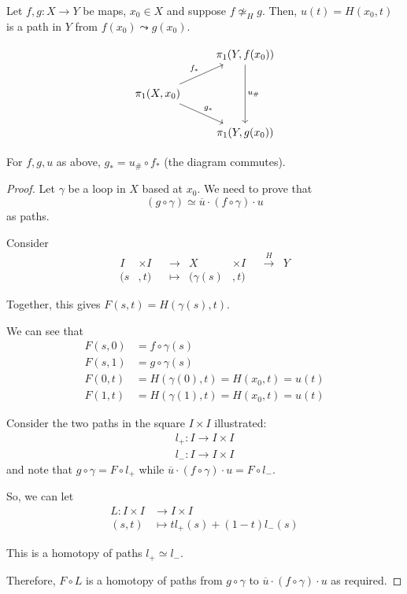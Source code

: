 \documentclass{article}
\numberwithin{nthm}{subsection}
\begin{document}
Let $f, g: X \to Y$ be maps, $x_0 \in X$ and suppose $f \not\simeq_{H} g$. Then, $u(t) = H(x_0, t)$ is a path in $Y$ from $f(x_0) \leadsto g(x_0)$.

\begin{equation*}
    \begin{tikzcd}
        & \pi_1(Y, f(x_0)) \arrow[dd, "u_{\#}"]\\
        \pi_1(X, x_0) \arrow[ur, "f_*"] \arrow[dr, "g_*"] & \\
                                                          & \pi_1(Y, g(x_0))
    \end{tikzcd}
\end{equation*}

\begin{lemma}
    For $f, g, u$ as above, $g_* = u_{\#} \circ f_*$ (the diagram commutes).
\end{lemma}

\begin{proof}
    Let $\gamma$ be a loop in $X$ based at $x_0$. We need to prove that
    \begin{equation*}
        (g \circ \gamma) \simeq \overline{u} \cdot (f \circ \gamma) \cdot u
    \end{equation*}
    as paths.

    Consider
    \begin{align*}
        I &\times I & &\to & X &\times I & &\xrightarrow{H} & Y \\
        (s&, t) & &\mapsto & (\gamma(s)&, t)
    \end{align*}

    Together, this gives $F(s, t) = H(\gamma(s), t)$.

    We can see that
    \begin{align*}
        F(s, 0) &= f \circ \gamma(s)\\
        F(s, 1) &= g \circ \gamma(s) \\
        F(0, t) &= H(\gamma(0), t) = H(x_0, t) = u(t) \\
        F(1, t) &= H(\gamma(1), t) = H(x_0, t) = u(t)
    \end{align*}

    Consider the two paths in the square $I \times I$ illustrated:
    \begin{align*}
        l_+ : I \to I \times I \\
        l_- : I \to I \times I
    \end{align*}
    and note that $g \circ \gamma = F \circ l_+$ while $\overline{u} \cdot (f \circ \gamma) \cdot u = F \circ l_-$.

    So, we can let
    \begin{align*}
        L: I \times I &\to I \times I \\
        (s, t) &\mapsto t l_+(s) + (1-t) l_-(s)
    \end{align*}

    This is a homotopy of paths $l_+ \simeq l_-$.

    Therefore, $F \circ L$ is a homotopy of paths from $g \circ \gamma$ to $\overline{u} \cdot (f \circ \gamma) \cdot u$ as required.
\end{proof}
\end{document}
